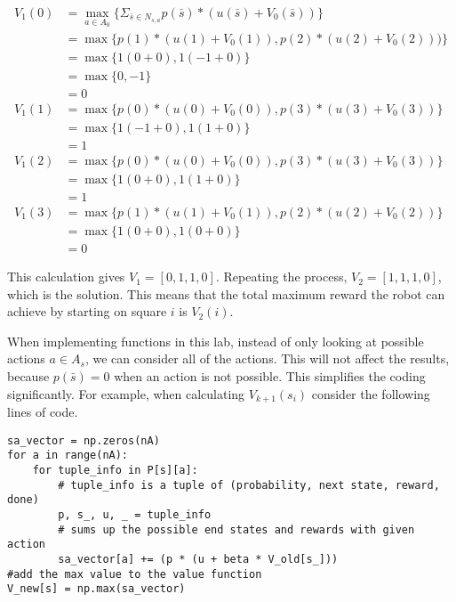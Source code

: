 \begin{align*}
V_1(0) &= \max_{a \in A_0} \{\Sigma_{\bar{s}\in N_{s,a}}p(\bar{s})*(u(\bar{s})+V_0(\bar{s}))\} \\
&= \max \{p(1)*(u(1)+V_0(1)), p(2)*(u(2)+V_0(2)))\} \\
&= \max \{1(0+0), 1(-1+0)\} \\
&= \max \{0,-1\} \\
&= 0 \\
V_1(1) &= \max \{p(0)*(u(0)+V_0(0)), p(3)*(u(3)+V_0(3))\} \\
&=\max \{1(-1+0), 1(1+0)\} \\
&= 1 \\
V_1(2) &= \max\{p(0)*(u(0)+V_0(0)), p(3)*(u(3)+V_0(3))\} \\
&=\max \{1(0+0),1(1+0)\} \\
&= 1 \\
V_1(3) &= \max\{p(1)*(u(1)+V_0(1)), p(2)*(u(2)+V_0(2))\} \\
&=\max \{1(0+0),1(0+0)\} \\
&= 0
\end{align*}

This calculation gives $V_1 = [0, 1, 1, 0]$.
Repeating the process, $V_2 = [1, 1, 1, 0]$, which is the solution.
This means that the total maximum reward the robot can achieve by starting on square $i$ is $V_2(i)$.

When implementing functions in this lab, instead of only looking at possible actions $a\in A_s$, we can consider all of the actions.
This will not affect the results, because $p(\bar{s}) = 0$ when an action is not possible.  
This simplifies the coding significantly.
For example, when calculating $V_{k+1}(s_i)$ consider the following lines of code.

\begin{lstlisting}
sa_vector = np.zeros(nA)
for a in range(nA):
    for tuple_info in P[s][a]:
        # tuple_info is a tuple of (probability, next state, reward, done)
        p, s_, u, _ = tuple_info
        # sums up the possible end states and rewards with given action
        sa_vector[a] += (p * (u + beta * V_old[s_]))
#add the max value to the value function        
V_new[s] = np.max(sa_vector)
\end{lstlisting}


